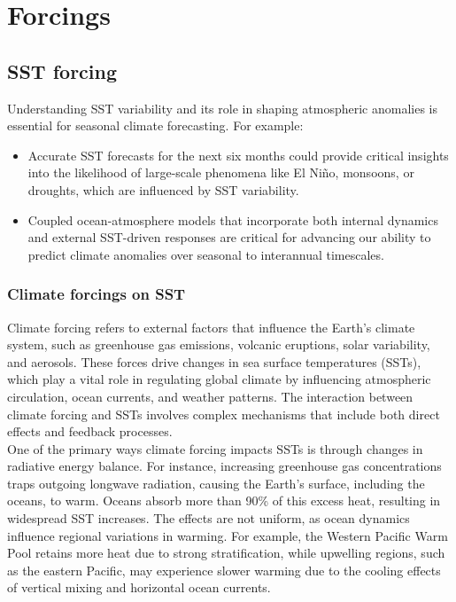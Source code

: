 \chapter{Forcings} 
\section{SST forcing}
Understanding SST variability and its role in shaping atmospheric anomalies is essential for seasonal climate forecasting. For example:
\begin{itemize}
    \item Accurate SST forecasts for the next six months could provide critical insights into the likelihood of large-scale phenomena like El Niño, monsoons, or droughts, which are influenced by SST variability.
    \item Coupled ocean-atmosphere models that incorporate both internal dynamics and external SST-driven responses are critical for advancing our ability to predict climate anomalies over seasonal to interannual timescales.
\end{itemize}

\subsection{Climate forcings on SST}
Climate forcing refers to external factors that influence the Earth’s climate system, such as greenhouse gas emissions, volcanic eruptions, solar variability, and aerosols. These forces drive changes in sea surface temperatures (SSTs), which play a vital role in regulating global climate by influencing atmospheric circulation, ocean currents, and weather patterns. The interaction between climate forcing and SSTs involves complex mechanisms that include both direct effects and feedback processes.\\


One of the primary ways climate forcing impacts SSTs is through changes in radiative energy balance. For instance, increasing greenhouse gas concentrations traps outgoing longwave radiation, causing the Earth’s surface, including the oceans, to warm. Oceans absorb more than 90\% of this excess heat, resulting in widespread SST increases. The effects are not uniform, as ocean dynamics influence regional variations in warming. For example, the Western Pacific Warm Pool retains more heat due to strong stratification, while upwelling regions, such as the eastern Pacific, may experience slower warming due to the cooling effects of vertical mixing and horizontal ocean currents.

